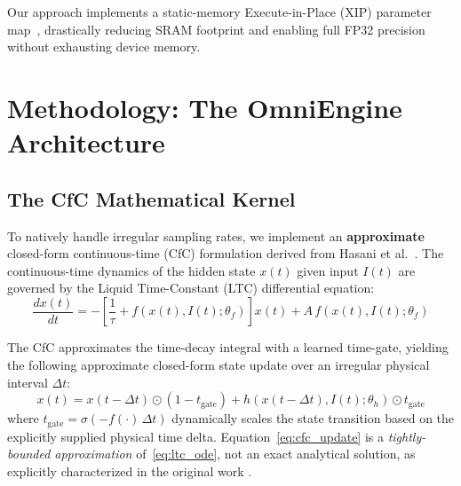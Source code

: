 \documentclass[conference]{IEEEtran}
\newcommand{\xt}{x(t)}
\newcommand{\xprev}{x(t-\Delta t)}
\newcommand{\dt}{\Delta t}
\newcommand{\tgate}{t_{\text{gate}}}
\begin{document}
Our approach implements a static-memory Execute-in-Place (XIP) parameter
map~\cite{libiseller2023xip}, drastically reducing SRAM footprint and enabling
full FP32 precision without exhausting device memory.

\section{Methodology: The OmniEngine Architecture}

\subsection{The CfC Mathematical Kernel}

To natively handle irregular sampling rates, we implement an
\textbf{approximate} closed-form continuous-time (CfC) formulation derived
from Hasani et al.~\cite{hasani2022closed}. The continuous-time dynamics of
the hidden state $\xt$ given input $I(t)$ are governed by the Liquid
Time-Constant (LTC) differential equation:
\begin{equation}
  \frac{d\xt}{dt} = -\!\left[\frac{1}{\tau}
    + f\!\left(\xt, I(t); \theta_f\right)\right]\xt
    + A\, f\!\left(\xt, I(t); \theta_f\right)
  \label{eq:ltc_ode}
\end{equation}

The CfC approximates the time-decay integral with a learned time-gate,
yielding the following approximate closed-form state update over an irregular
physical interval $\dt$:
\begin{equation}
  \xt = \xprev \odot (1 - \tgate)
      + h\!\left(\xprev, I(t); \theta_h\right) \odot \tgate
  \label{eq:cfc_update}
\end{equation}
where $\tgate = \sigma\!\left(-f(\cdot)\,\dt\right)$ dynamically scales the
state transition based on the explicitly supplied physical time delta.
Equation~\eqref{eq:cfc_update} is a \emph{tightly-bounded approximation}
of~\eqref{eq:ltc_ode}, not an exact analytical solution, as explicitly
characterized in the original work \cite{hasani2022closed}.
\end{document}
